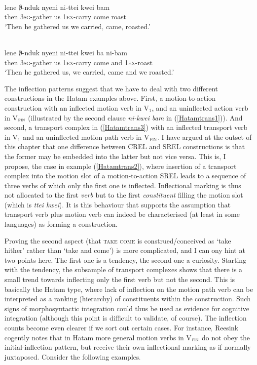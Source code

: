 \ea \label{Hatamtrans2}
\\
\gll lene $\emptyset$-nduk nyeni ni-ttei kwei bam \\ 
then \textsc{3}\textsc{sg}-gather us \textsc{1}\textsc{ex}-carry come roast \\
\glft `Then he gathered us we carried, came, roasted.' \\ 
\z

\ea \label{Hatamtrans3}
\\
\gll lene $\emptyset$-nduk nyeni ni-ttei kwei ba ni-bam \\ 
then \textsc{3}\textsc{sg}-gather us \textsc{1}\textsc{ex}-carry come and \textsc{1}\textsc{ex}-roast \\
\glft `Then he gathered us, we carried, came and we roasted.'\\ 
\z

The inflection patterns suggest that we have to deal with two different constructions in the Hatam examples above. First, a motion-to-action construction with an inflected motion verb in V$_{1}$, and an uninflected action verb in V$_{\textsc{fin}}$ (illustrated by the second clause \textit{ni-kwei bam} in (\ref{Hatamtrans1})). And second, a transport complex in (\ref{Hatamtrans3}) with an inflected transport verb in V$_{1}$ and an uninflected motion path verb in V$_{\textsc{fin}}$. I have argued at the outset of this chapter that one difference between CREL and SREL constructions is that the former may be embedded into the latter but not vice versa. This is, I propose, the case in example (\ref{Hatamtrans2}), where insertion of a transport complex into the motion slot of a motion-to-action SREL leads to a sequence of three verbs of which only the first one is inflected. Inflectional marking is thus not allocated to the first \emph{verb} but to the first \emph{constituent} filling the motion slot (which is \textit{ttei kwei}). It is this behaviour that supports the assumption that transport verb plus motion verb can indeed be characterised (at least in some languages) as forming a construction.

Proving the second aspect (that \textsc{take} \textsc{come} is construed/conceived as `take hither' rather than `take and come') is more complicated, and I can ony hint at two points here. The first one is a tendency, the second one a curiosity. Starting with the tendency, the subsample of transport complexes shows that there is a small trend towards inflecting only the first verb but not the second. This is basically the Hatam type, where lack of inflection on the motion path verb can be interpreted as a ranking (hierarchy) of constituents within the construction. Such signs of morphosyntactic integration could thus be used as evidence for cognitive integration (although this point is difficult to validate, of course). The inflection counts become even clearer if we sort out certain cases. For instance, Reesink cogently notes that in Hatam more general motion verbs in V$_{\textsc{fin}}$ do not obey the initial-inflection pattern, but receive their own inflectional marking as if normally juxtaposed. Consider the following examples.

